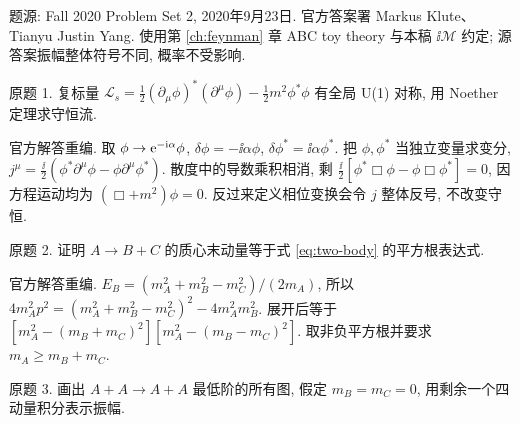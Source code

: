 题源: Fall 2020 Problem Set 2, 2020年9月23日. 官方答案署 Markus Klute、Tianyu Justin Yang. 使用第 \ref{ch:feynman} 章 ABC toy theory 与本稿 $\ii\mathcal M$ 约定; 源答案振幅整体符号不同, 概率不受影响.

\begin{exercise}\label{ex:8701-2-1}
原题 1. 复标量 $\mathcal L_s=\tfrac12(\partial_\mu\phi)^*(\partial^\mu\phi)-\tfrac12m^2\phi^*\phi$ 有全局 U(1) 对称, 用 Noether 定理求守恒流.
\end{exercise}
\begin{solution}
官方解答重编. 取 $\phi\to\mathrm e^{-\mathrm i\alpha}\phi$, $\delta\phi=-\ii\alpha\phi$, $\delta\phi^*=\ii\alpha\phi^*$. 把 $\phi,\phi^*$ 当独立变量求变分,
$j^\mu=\tfrac\ii2(\phi^*\partial^\mu\phi-\phi\partial^\mu\phi^*)$.
散度中的导数乘积相消, 剩 $\tfrac\ii2[\phi^*\Box\phi-\phi\Box\phi^*]=0$, 因方程运动均为 $(\Box+m^2)\phi=0$. 反过来定义相位变换会令 $j$ 整体反号, 不改变守恒.
\end{solution}
\begin{exercise}\label{ex:8701-2-2}
原题 2. 证明 $A\to B+C$ 的质心末动量等于式 \eqref{eq:two-body} 的平方根表达式.
\end{exercise}
\begin{solution}
官方解答重编. $E_B=(m_A^2+m_B^2-m_C^2)/(2m_A)$, 所以 $4m_A^2p^2=(m_A^2+m_B^2-m_C^2)^2-4m_A^2m_B^2$. 展开后等于 $[m_A^2-(m_B+m_C)^2][m_A^2-(m_B-m_C)^2]$. 取非负平方根并要求 $m_A\ge m_B+m_C$.
\end{solution}
\begin{exercise}\label{ex:8701-2-3}
原题 3. 画出 $A+A\to A+A$ 最低阶的所有图, 假定 $m_B=m_C=0$, 用剩余一个四动量积分表示振幅.
\end{exercise}
